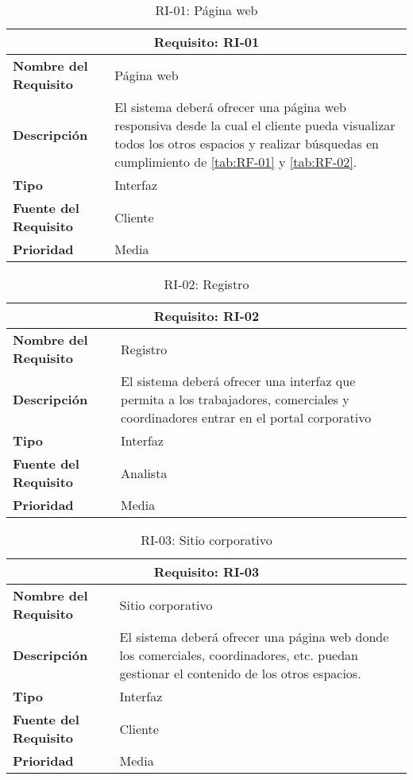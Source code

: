 \begin{table}[H]
\begin{center}
\begin{tabular}{p{} p{7cm}}
\multicolumn{2}{c}{\textbf{Requisito: RI-01} } \\
\hline \hline
\textbf{Nombre del Requisito} & Página web  \\
\hline
\textbf{Descripción} & El sistema deberá ofrecer una página web responsiva desde la cual el cliente pueda visualizar todos los otros espacios y realizar búsquedas en cumplimiento de \ref{tab:RF-01} y \ref{tab:RF-02}.  \\
\hline
\textbf{Tipo} & Interfaz \\
\hline
\textbf{Fuente del Requisito} & Cliente  \\
\hline
\textbf{Prioridad} & Media  \\ \hline
\end{tabular}
\caption{RI-01: Página web}
\label{tab:RI-01}
\end{center}
\end{table}

\begin{table}[H]
\begin{center}
\begin{tabular}{p{} p{7cm}}
\multicolumn{2}{c}{\textbf{Requisito: RI-02} } \\
\hline \hline
\textbf{Nombre del Requisito} & Registro  \\
\hline
\textbf{Descripción} & El sistema deberá ofrecer una interfaz que permita a los trabajadores, comerciales y coordinadores entrar en el portal corporativo \\
\hline
\textbf{Tipo} & Interfaz \\
\hline
\textbf{Fuente del Requisito} & Analista \\
\hline
\textbf{Prioridad} & Media  \\ \hline
\end{tabular}
\caption{RI-02: Registro}
\label{tab:RI-02}
\end{center}
\end{table}

\begin{table}[H]
\begin{center}
\begin{tabular}{p{} p{7cm}}
\multicolumn{2}{c}{\textbf{Requisito: RI-03} } \\
\hline \hline
\textbf{Nombre del Requisito} & Sitio corporativo  \\
\hline
\textbf{Descripción} & El sistema deberá ofrecer una página web donde los comerciales, coordinadores, etc. puedan gestionar el contenido de los otros espacios. \\
\hline
\textbf{Tipo} & Interfaz \\
\hline
\textbf{Fuente del Requisito} & Cliente  \\
\hline
\textbf{Prioridad} & Media  \\ \hline
\end{tabular}
\caption{RI-03: Sitio corporativo}
\label{tab:RI-03}
\end{center}
\end{table}


